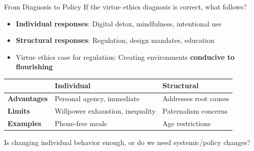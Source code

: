 ﻿\documentclass[aspectratio=169,11pt]{beamer}
\begin{document}
\begin{frame}{From Diagnosis to Policy}
If the virtue ethics diagnosis is correct, what follows?

\begin{itemize}
    \item \textbf{Individual responses}: Digital detox, mindfulness, intentional use
    \item \textbf{Structural responses}: Regulation, design mandates, education
    \item Virtue ethics case for regulation: Creating environments \textbf{conducive to flourishing}
\end{itemize}

\vspace{0.3cm}
\begin{table}[h]
\centering
\small
\begin{tabular}{>{\bfseries}l p{4cm} p{4cm}}
\toprule
& \textbf{Individual} & \textbf{Structural} \\
\midrule
Advantages & Personal agency, immediate & Addresses root causes \\
Limits & Willpower exhaustion, inequality & Paternalism concerns \\
Examples & Phone-free meals & Age restrictions \\
\bottomrule
\end{tabular}
\end{table}

\begin{discussionbox}[Discussion]
Is changing individual behavior enough, or do we need systemic/policy changes?
\end{discussionbox}
\end{frame}
\end{document}
